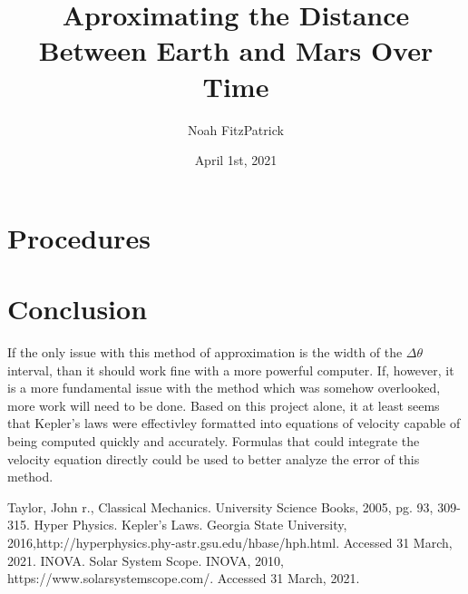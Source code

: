 \documentclass{article}
\author{Noah FitzPatrick}
\title{Aproximating the Distance Between Earth and Mars Over Time}
\date{April 1st, 2021}
\begin{document}
\maketitle

\section{Procedures}


\section{Conclusion}
If the only issue with this method of approximation is the width of the $\Delta\theta$ interval, than it should work
fine with a more powerful computer. If, however, it is a more fundamental issue with the method which was somehow 
overlooked, more work will need to be done. Based on this project alone, it at least seems that Kepler's laws were 
effectivley formatted into equations of velocity capable of being computed quickly and accurately. Formulas that
could integrate the velocity equation directly could be used to better analyze the error of this method. 
\begin{thebibliography}{}
	 Taylor, John r., Classical Mechanics. University Science Books, 2005, pg. 93, 
		309-315.
	 Hyper Physics. Kepler's Laws. Georgia State University, 2016,http://hyperphysics.phy-astr.gsu.edu/hbase/hph.html. Accessed 31 March, 2021.
         INOVA. Solar System Scope. INOVA, 2010, https://www.solarsystemscope.com/. Accessed 31 March, 2021.

\end{thebibliography}
\end{document}
